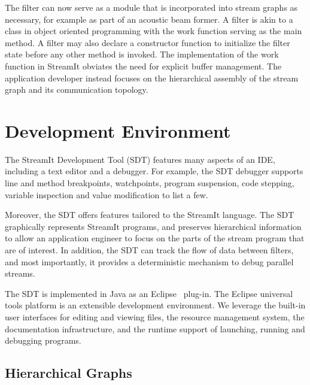 \documentclass[times, 10pt,twocolumn]{article}
\begin{document}
The filter can now serve as  a module that is incorporated into stream
graphs as necessary, for example as part of an acoustic beam former. A
filter is akin to a class in object oriented programming with the work
function  serving as  the main  method. A  filter may  also  declare a
constructor function  to initialize the filter state  before any other
method is invoked. The implementation of the work function in StreamIt
obviates  the need  for  explicit buffer  management. The  application
developer instead focuses on the  hierarchical assembly of  the stream
graph and its communication topology.


\section{Development Environment}
\label{sec:de}

The StreamIt  Development Tool (SDT)  features many aspects of  an IDE,
including a text editor and  a debugger. For example, the SDT debugger
supports line and method breakpoints, watchpoints, program suspension,
code stepping,  variable inspection and  value modification to  list a
few.

Moreover,   the  SDT   offers  features   tailored  to   the  StreamIt
language.  The  SDT  graphically  represents  StreamIt  programs,  and
preserves hierarchical information to allow an application engineer to
focus on  the parts of  the stream program  that are of  interest. In
addition, the SDT can track the flow of data between filters, and most
importantly, it  provides a deterministic mechanism  to debug parallel
streams.

The SDT  is implemented in Java as  an Eclipse~\cite{eclipse} plug-in.
The  Eclipse universal  tools  platform is  an extensible  development
environment. We leverage the built-in user interfaces for editing and
viewing  files,  the  resource  management system,  the  documentation
infrastructure,  and the  runtime  support of  launching, running  and
debugging programs.



\subsection{Hierarchical Graphs}
\end{document}
